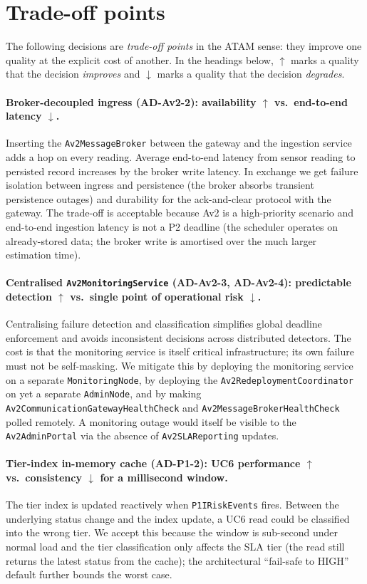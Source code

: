 \section{Trade-off points}

The following decisions are \emph{trade-off points} in the ATAM sense:
they improve one quality at the explicit cost of another. In the
headings below, $\uparrow$ marks a quality that the decision
\emph{improves} and $\downarrow$ marks a quality that the decision
\emph{degrades}.

\paragraph{Broker-decoupled ingress (AD-Av2-2): availability $\uparrow$
vs.\ end-to-end latency $\downarrow$.}
Inserting the \texttt{Av2MessageBroker} between the gateway and the
ingestion service adds a hop on every reading. Average end-to-end
latency from sensor reading to persisted record increases by the broker
write latency. In exchange we get failure isolation between ingress and
persistence (the broker absorbs transient persistence outages) and
durability for the ack-and-clear protocol with the gateway. The
trade-off is acceptable because Av2 is a high-priority scenario and
end-to-end ingestion latency is not a P2 deadline (the scheduler
operates on already-stored data; the broker write is amortised over the
much larger estimation time).

\paragraph{Centralised \texttt{Av2MonitoringService} (AD-Av2-3, AD-Av2-4):
predictable detection $\uparrow$ vs.\ single point of operational risk
$\downarrow$.}
Centralising failure detection and classification simplifies global
deadline enforcement and avoids inconsistent decisions across
distributed detectors. The cost is that the monitoring service is itself
critical infrastructure; its own failure must not be self-masking. We
mitigate this by deploying the monitoring service on a separate
\texttt{MonitoringNode}, by deploying the
\texttt{Av2RedeploymentCoordinator} on yet a separate
\texttt{AdminNode}, and by making
\texttt{Av2CommunicationGatewayHealthCheck} and
\texttt{Av2MessageBrokerHealthCheck} polled remotely. A monitoring
outage would itself be visible to the \texttt{Av2AdminPortal} via the
absence of \texttt{Av2SLAReporting} updates.

\paragraph{Tier-index in-memory cache (AD-P1-2): UC6 performance $\uparrow$
vs.\ consistency $\downarrow$ for a millisecond window.}
The tier index is updated reactively when \texttt{P1IRiskEvents} fires.
Between the underlying status change and the index update, a UC6 read
could be classified into the wrong tier. We accept this because the
window is sub-second under normal load and the tier classification only
affects the SLA tier (the read still returns the latest status from the
cache); the architectural ``fail-safe to HIGH'' default further bounds
the worst case.

